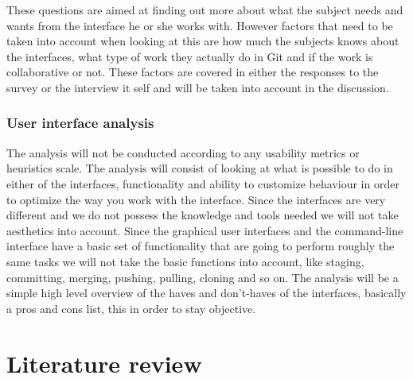 \documentclass[a4paper,oneside]{bth} %
\begin{document}
						These questions are aimed at finding out more about what the subject needs and wants from the interface he or she works with. However factors that need to be taken into account when looking at this are how much the subjects knows about the interfaces, what type of work they actually do in Git and if the work is collaborative or not. These factors are covered in either the responses to the survey or the interview it self and will be taken into account in the discussion.
				\subsection{User interface analysis}
				The analysis will not be conducted according to any usability metrics or heuristics scale. The analysis will consist of looking at what is possible to do in either of the interfaces, functionality and ability to customize behaviour in order to optimize the way you work with the interface. Since the interfaces are very different and we do not possess the knowledge and tools needed we will not take aesthetics into account. Since the graphical user interfaces and the command-line interface have a basic set of functionality that are going to perform roughly the same tasks we will not take the basic functions into account, like staging, committing, merging, pushing, pulling, cloning and so on.
				The analysis will be a simple high level overview of the haves and don't-haves of the interfaces, basically a pros and cons list, this in order to stay objective.
		
		\chapter{Literature review}
		
\end{document}
